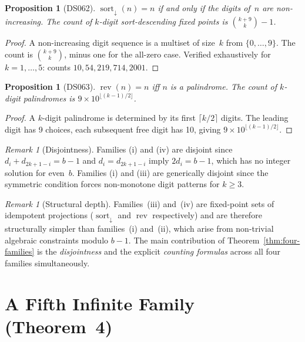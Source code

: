 \documentclass[11pt,a4paper]{amsart}
\theoremstyle{plain}
\newtheorem{proposition}[theorem]{Proposition}
\theoremstyle{definition}
\theoremstyle{remark}
\newtheorem{remark}[theorem]{Remark}
\DeclareMathOperator{\rev}{rev}
\DeclareMathOperator{\sort}{sort}
\begin{document}
\begin{proposition}[DS062]\label{prop:sort-desc}
$\sort_\downarrow(n) = n$ if and only if the digits of~$n$ are non-increasing.
The count of $k$-digit sort-descending fixed points is $\binom{k+9}{k} - 1$.
\end{proposition}

\begin{proof}
A non-increasing digit sequence is a multiset of size~$k$ from $\{0,\ldots,9\}$.
The count is $\binom{k+9}{k}$, minus one for the all-zero case. Verified
exhaustively for $k = 1, \ldots, 5$: counts $10, 54, 219, 714, 2001$.
\end{proof}

\begin{proposition}[DS063]\label{prop:palindrome}
$\rev(n) = n$ iff $n$ is a palindrome. The count of $k$-digit palindromes is
$9 \times 10^{\lfloor(k-1)/2\rfloor}$.
\end{proposition}

\begin{proof}
A $k$-digit palindrome is determined by its first $\lceil k/2 \rceil$ digits.
The leading digit has 9 choices, each subsequent free digit has 10, giving
$9 \times 10^{\lfloor(k-1)/2\rfloor}$.
\end{proof}

\begin{remark}[Disjointness]
Families (i) and (iv) are disjoint since $d_i + d_{2k+1-i} = b{-}1$ and
$d_i = d_{2k+1-i}$ imply $2d_i = b{-}1$, which has no integer solution for
even~$b$. Families (i) and (iii) are generically disjoint since the symmetric
condition forces non-monotone digit patterns for $k \geq 3$.
\end{remark}

\begin{remark}[Structural depth]
Families~(iii) and~(iv) are fixed-point sets of idempotent projections
($\sort_\downarrow$ and $\rev$ respectively) and are therefore structurally
simpler than families~(i) and~(ii), which arise from non-trivial algebraic
constraints modulo $b{-}1$. The main contribution of
Theorem~\ref{thm:four-families} is the \emph{disjointness} and the explicit
\emph{counting formulas} across all four families simultaneously.
\end{remark}

\section{A Fifth Infinite Family (Theorem~4)}\label{sec:fifth-family}
\end{document}
